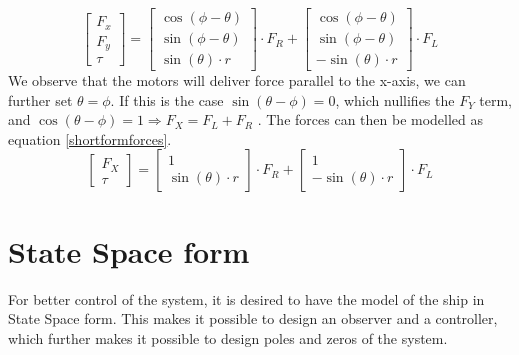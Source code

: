 \begin{equation}
\left[
\begin{matrix}
F_x\\
F_y\\
\tau
\end{matrix}
\right]
 =
 \left[
\begin{matrix}
\cos(\phi - \theta)\\
\sin(\phi - \theta)\\
\sin(\theta) \cdot r
\end{matrix}
\right]
\cdot F_R
+
 \left[
\begin{matrix}
\cos(\phi - \theta)\\
\sin(\phi - \theta)\\
-\sin(\theta) \cdot r
\end{matrix}
\right]
\cdot
F_L
\label{Forceequation}
\end{equation}
We observe that the motors will deliver force parallel to the x-axis, we can further set $\theta = \phi$. If this is the case $\sin(\theta - \phi)=0$, which nullifies the $F_Y$ term, and $\cos(\theta-\phi) = 1 \Longrightarrow F_X = F_L+F_R$ . The forces can then be modelled as equation \eqref{shortformforces}.
\begin{equation}
\left[\begin{matrix}
F_X\\
\tau
\end{matrix}
\right]
= 
\left[
\begin{matrix}
1\\
\sin(\theta)\cdot r
\end{matrix}
\right]
\cdot F_R
+ 
\left[
\begin{matrix}
1\\
-\sin(\theta)\cdot r
\end{matrix}
\right]
\cdot F_L
\label{shortformforces}
\end{equation}

\section{State Space form}
For better control of the system, it is desired to have the model of the ship in State Space form. This makes it possible to design an observer and a controller, which further makes it possible to design poles and zeros of the system.

